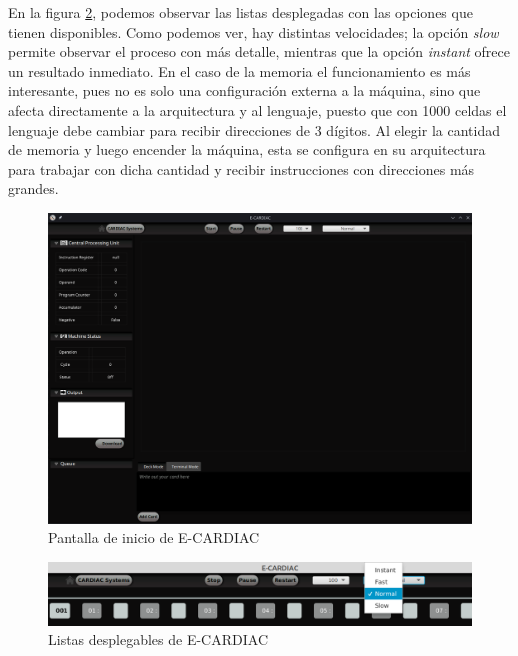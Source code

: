 \documentclass[letterpaper,12pt,oneside]{book}
\begin{document}
    En la figura \ref{fig:listasDespCardiac},
	podemos observar las listas desplegadas con las opciones que tienen disponibles. Como podemos ver, hay distintas velocidades; la opción 	
	\textit{slow} permite observar el proceso con más detalle, mientras que la opción \textit{instant} ofrece un resultado inmediato. En el caso de la memoria el funcionamiento es más interesante, pues
	no es solo una configuración externa a la máquina, sino que afecta directamente a la arquitectura y al lenguaje, puesto que con 1000 celdas el lenguaje
	debe cambiar para recibir direcciones de 3 dígitos. Al elegir la cantidad de memoria y luego encender la máquina, esta se configura en su arquitectura para trabajar con dicha
	cantidad y recibir instrucciones con direcciones más grandes.

	\begin{figure}[h]
 			\centering
			\includegraphics[scale=0.45]{media/ECARDIAC/ECARDIAC_P1.png}
			\caption{Pantalla de inicio de E-CARDIAC}
			\label{fig:iniECardiac}
	\end{figure}


	\begin{figure}[H]
 			\centering
			\includegraphics[scale=0.45]{media/ECARDIAC/ecardiac_lista_velocidad.png}
			\caption{Listas desplegables de E-CARDIAC}
			\label{fig:listasDespCardiac}
	\end{figure}
\end{document}
